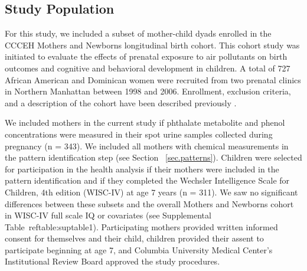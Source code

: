 \subsection{Study Population}
For this study, we included a subset of mother-child dyads enrolled in the CCCEH Mothers and Newborns longitudinal birth cohort. This cohort study was initiated to evaluate the effects of prenatal exposure to air pollutants on birth outcomes and cognitive and behavioral development in children. A total of 727 African American and Dominican women were recruited from two prenatal clinics in Northern Manhattan between 1998 and 2006. Enrollment, exclusion criteria, and a description of the cohort have been described previously \cite{perera03}.

We included mothers in the current study if phthalate metabolite and phenol concentrations were measured in their spot urine samples collected during pregnancy (n = 343). We included all mothers with chemical measurements in the pattern identification step (see Section ~\ref{sec.patterns}). Children were selected for participation in the health analysis if their mothers were included in the pattern identification and if they completed the Wechsler Intelligence Scale for Children, 4th edition (WISC-IV) at age 7 years (n = 311). We saw no significant differences between these subsets and the overall Mothers and Newborns cohort in WISC-IV full scale IQ or covariates (see Supplemental Table~ref{table:suptable1}). Participating mothers provided written informed consent for themselves and their child, children provided their assent to participate beginning at age 7, and Columbia University Medical Center's Institutional Review Board approved the study procedures.

